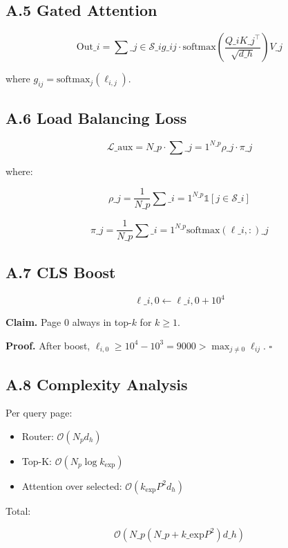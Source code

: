 \subsection{A.5 Gated Attention}

\[
\text{Out}\_i = \sum\_{j \in \mathcal{S}\_i} g\_{ij} \cdot \text{softmax}\!\left(\frac{Q\_i K\_j^\top}{\sqrt{d\_h}}\right) V\_j
\tag{A.10}
\]

where $g_{ij} = \text{softmax}_j(\ell_{i, j})$.

\subsection{A.6 Load Balancing Loss}

\[
\mathcal{L}\_\text{aux} = N\_p \cdot \sum\_{j=1}^{N\_p} \rho\_j \cdot \pi\_j
\tag{A.11}
\]

where:

\[
\rho\_j = \frac{1}{N\_p} \sum\_{i=1}^{N\_p} \mathbb{1}[j \in \mathcal{S}\_i]
\tag{A.12}
\]

\[
\pi\_j = \frac{1}{N\_p} \sum\_{i=1}^{N\_p} \text{softmax}(\ell\_{i, :})\_j
\tag{A.13}
\]

\subsection{A.7 CLS Boost}

\[
\ell\_{i, 0} \leftarrow \ell\_{i, 0} + 10^4
\tag{A.14}
\]

\textbf{Claim.} Page 0 always in top-$k$ for $k \geq 1$.

\textbf{Proof.} After boost, $\ell_{i, 0} \geq 10^4 - 10^3 = 9000 > \max_{j \neq 0} \ell_{ij}$. $\square$

\subsection{A.8 Complexity Analysis}

Per query page:
\begin{itemize}
\item Router: $\mathcal{O}(N_p d_h)$
\item Top-K: $\mathcal{O}(N_p \log k_\text{exp})$
\item Attention over selected: $\mathcal{O}(k_\text{exp} P^2 d_h)$

\end{itemize}
Total:

\[
\mathcal{O}(N\_p (N\_p + k\_\text{exp} P^2) d\_h)
\tag{A.15}
\]

